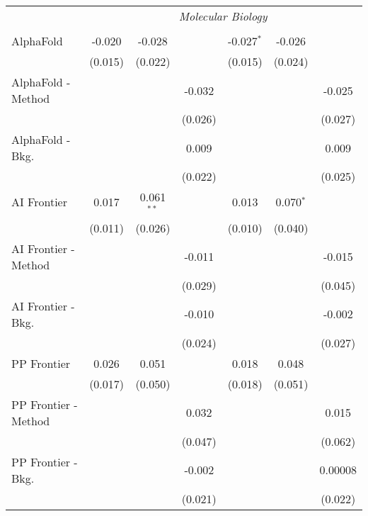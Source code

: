 \begin{tabular}{lcccccc}
 & \multicolumn{6}{c}{\textit{Molecular Biology}} \\ \\
   AlphaFold            & -0.020  & -0.028         &         & -0.027$^{*}$ & -0.026        &   \\   
                        & (0.015) & (0.022)        &         & (0.015)      & (0.024)       &   \\   
   AlphaFold - Method   &         &                & -0.032  &              &               & -0.025\\   
                        &         &                & (0.026) &              &               & (0.027)\\   
   AlphaFold - Bkg.     &         &                & 0.009   &              &               & 0.009\\   
                        &         &                & (0.022) &              &               & (0.025)\\   
   AI Frontier          & 0.017   & 0.061$^{**}$   &         & 0.013        & 0.070$^{*}$   &   \\   
                        & (0.011) & (0.026)        &         & (0.010)      & (0.040)       &   \\   
   AI Frontier - Method &         &                & -0.011  &              &               & -0.015\\   
                        &         &                & (0.029) &              &               & (0.045)\\   
   AI Frontier - Bkg.   &         &                & -0.010  &              &               & -0.002\\   
                        &         &                & (0.024) &              &               & (0.027)\\   
   PP Frontier          & 0.026   & 0.051          &         & 0.018        & 0.048         &   \\   
                        & (0.017) & (0.050)        &         & (0.018)      & (0.051)       &   \\   
   PP Frontier - Method &         &                & 0.032   &              &               & 0.015\\   
                        &         &                & (0.047) &              &               & (0.062)\\   
   PP Frontier - Bkg.   &         &                & -0.002  &              &               & 0.00008\\   
                        &         &                & (0.021) &              &               & (0.022)\\   

\end{tabular}
